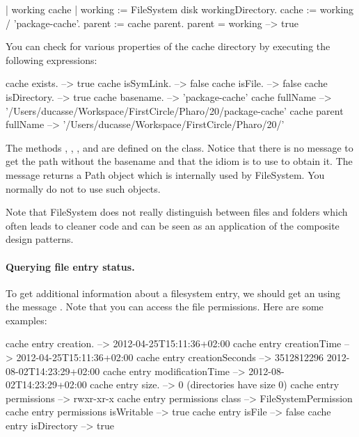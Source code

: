 \documentclass[a4paper,10pt,twoside]{book}
\begin{document}
\begin{code}{}
| working cache |
working := FileSystem disk workingDirectory.
cache := working / 'package-cache'.
parent := cache parent.
parent = working			
--> true
\end{code}

You can check for various properties of the cache directory by executing the following expressions:

\begin{code}{}
cache exists.				--> true
cache isSymLink.				--> false
cache isFile.				--> false
cache isDirectory.			--> true
cache basename.			--> 'package-cache'
cache fullName           
  --> '/Users/ducasse/Workspace/FirstCircle/Pharo/20/package-cache'
cache parent fullName    
  --> '/Users/ducasse/Workspace/FirstCircle/Pharo/20/'
\end{code}
 


The methods , , , and   are defined on the  class. Notice that there is no message to get 
the path without the basename and that the idiom is to use  to obtain it.
The message  returns a Path object which is internally used by FileSystem. You normally do not to use such objects. 
  
Note that FileSystem does not really distinguish between files and folders which often leads to cleaner code and can be seen as an application of the composite design patterns.   
  
\paragraph{Querying file entry status.}
To get additional information about a filesystem entry, we should get an  using the message . Note that you can access the file permissions. Here are some examples:

\begin{code}{}
cache entry creation.		-->  2012-04-25T15:11:36+02:00
cache entry creationTime -->  2012-04-25T15:11:36+02:00
cache entry creationSeconds -->  3512812296 2012-08-02T14:23:29+02:00
cache entry modificationTime -->  2012-08-02T14:23:29+02:00
cache entry size.			--> 0 (directories have size 0)
cache entry permissions		-->  rwxr-xr-x
cache entry permissions class		-->  FileSystemPermission
cache entry permissions isWritable --> true
cache entry isFile			--> false
cache entry isDirectory 		--> true
\end{code} 
\end{document}
